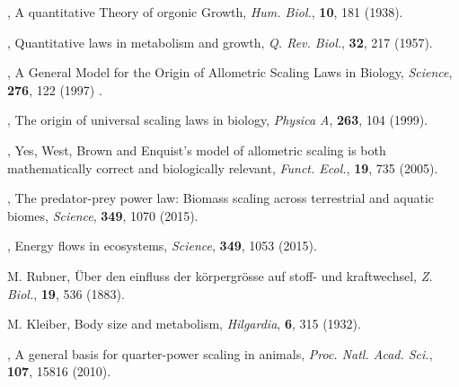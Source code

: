 \begin{thebibliography}{100}

, {A quantitative Theory of orgonic Growth}, \textit{Hum. Biol.}, \textbf{10}, {181} {(1938)}.


, {Quantitative laws in metabolism and growth}, \textit{Q. Rev. Biol.}, \textbf{32}, {217} {(1957)}.

, {A General Model for the Origin of Allometric Scaling Laws in Biology}, \textit{Science}, \textbf{276}, {122} {(1997)} .

, { The origin of universal scaling laws in biology}, \textit{Physica A}, \textbf{263}, {104} {(1999)}.

, {Yes, West, Brown and Enquist's model of allometric scaling is both mathematically correct and biologically relevant}, \textit{Funct. Ecol.}, \textbf{19}, 735 {(2005)}.

, {The predator-prey power law: Biomass scaling across terrestrial and aquatic biomes}, \textit{Science}, \textbf{349}, {1070} {(2015)}.

, {Energy flows in ecosystems}, \textit{Science}, \textbf{349},  {1053} {(2015)}.

 M. Rubner, {{\"{U}}ber den einfluss der k{\"{o}}rpergr{\"{o}}sse auf stoff- und kraftwechsel}, \textit{Z. Biol.}, \textbf{19},  536 (1883).

 M. Kleiber, {Body size and metabolism}, \textit{Hilgardia}, \textbf{6}, 315 (1932).

, {A general basis for quarter-power scaling in animals}, \textit{Proc. Natl. Acad. Sci.}, \textbf{107}, {15816} {(2010)}.




\end{thebibliography}
